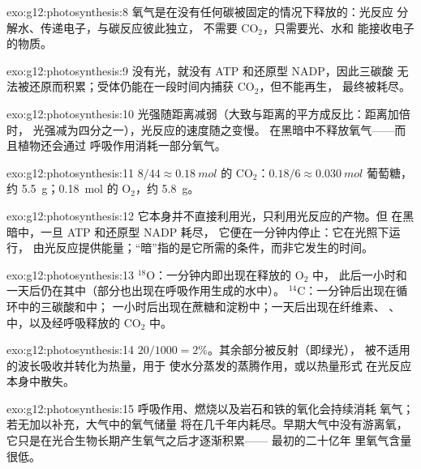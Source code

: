 \begin{solution}{exo:g12:photosynthesis:8}
氧气是在没有任何碳被固定的情况下释放的：光反应
分解水、传递电子，与碳反应彼此独立，
不需要 $\mathrm{CO_2}$，只需要光、水和
能接收电子的物质。
\end{solution}

\begin{solution}{exo:g12:photosynthesis:9}
没有光，就没有 ATP 和还原型 NADP，因此三碳酸
无法被还原而积累；受体仍能在一段时间内捕获
$\mathrm{CO_2}$，但不能再生，
最终被耗尽。
\end{solution}

\begin{solution}{exo:g12:photosynthesis:10}
光强随距离减弱（大致与距离的平方成反比：距离加倍时，
光强减为四分之一），光反应的速度随之变慢。
在黑暗中不释放氧气——而且植物还会通过
呼吸作用消耗一部分氧气。
\end{solution}

\begin{solution}{exo:g12:photosynthesis:11}
$8/44 \approx \qty{0.18}{mol}$ 的 $\mathrm{CO_2}$：$0.18/6 \approx
\qty{0.030}{mol}$ 葡萄糖，约 \qty{5.5}{g}；\qty{0.18}{mol} 的
$\mathrm{O_2}$，约 \qty{5.8}{g}。
\end{solution}

\begin{solution}{exo:g12:photosynthesis:12}
它本身并不直接利用光，只利用光反应的产物。但
在黑暗中，一旦 ATP 和还原型 NADP 耗尽，
它便在一分钟内停止：它在光照下运行，
由光反应提供能量；“暗”指的是它所需的条件，而非它发生的时间。
\end{solution}

\begin{solution}{exo:g12:photosynthesis:13}
$^{18}$O：一分钟内即出现在释放的 $\mathrm{O_2}$ 中，
此后一小时和一天后仍在其中（部分也出现在呼吸作用生成的水中）。
$^{14}$C：一分钟后出现在循环中的三碳酸和中；
一小时后出现在蔗糖和淀粉中；一天后出现在纤维素、
、中，以及经呼吸释放的 $\mathrm{CO_2}$ 中。
\end{solution}

\begin{solution}{exo:g12:photosynthesis:14}
$20/1000 = 2\%$。其余部分被反射（即绿光），
被不适用的波长吸收并转化为热量，用于
使水分蒸发的蒸腾作用，或以热量形式
在光反应本身中散失。
\end{solution}

\begin{solution}{exo:g12:photosynthesis:15}
呼吸作用、燃烧以及岩石和铁的氧化会持续消耗
氧气；若无加以补充，大气中的氧气储量
将在几千年内耗尽。早期大气中没有游离氧，
它只是在光合生物长期产生氧气之后才逐渐积累——
最初的二十亿年
里氧气含量很低。
\end{solution}

